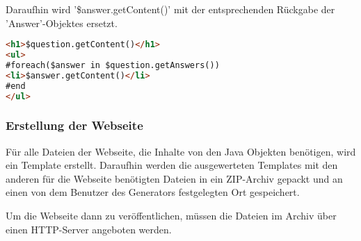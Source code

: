 Daraufhin wird '\$answer.getContent()' mit der entsprechenden Rückgabe der 'Answer'-Objektes ersetzt.


\begin{lstlisting}[basicstyle=\tiny,label={lst:velocity-example},caption={Beispiel eines Velocity Templates.},language=HTML]
<h1>$question.getContent()</h1>
<ul>
#foreach($answer in $question.getAnswers())
<li>$answer.getContent()</li>
#end
</ul>
\end{lstlisting}

\subsubsection{Erstellung der Webseite}
Für alle Dateien der Webseite, die Inhalte von den Java Objekten benötigen, wird ein Template erstellt.
Daraufhin werden die ausgewerteten Templates mit den anderen für die Webseite benötigten Dateien in ein ZIP-Archiv gepackt und an einen von dem Benutzer des Generators festgelegten Ort gespeichert.

Um die Webseite dann zu veröffentlichen, müssen die Dateien im Archiv über einen HTTP-Server angeboten werden.



